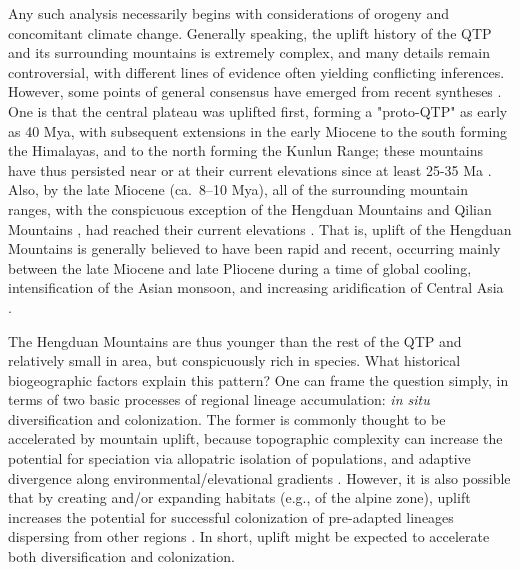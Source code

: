 Any such analysis necessarily begins with considerations of orogeny and concomitant climate change. Generally speaking, the uplift history of the QTP and its surrounding mountains is extremely complex, and many details remain controversial, with different lines of evidence often yielding conflicting inferences. However, some points of general consensus have emerged from recent syntheses \citep{Wang2014, Favre2014, Deng2015}. One is that the central plateau was uplifted first, forming a "proto-QTP" as early as 40 Mya, with subsequent extensions in the early Miocene to the south forming the Himalayas, and to the north forming the Kunlun Range; these mountains have thus persisted near or at their current elevations since at least 25-35 Ma \citep{Rowley2006, Wang2014}. Also, by the late Miocene (ca.\ 8--10 Mya), all of the surrounding mountain ranges, with the conspicuous exception of the Hengduan Mountains and Qilian Mountains , had reached their current elevations \citep{SunB2011,Fang2005,WangE2012,Wang2014,Favre2014,Deng2015}. That is, uplift of the Hengduan Mountains is generally believed to have been rapid and recent, occurring mainly between the late Miocene and late Pliocene \citep{WangE2012,Wang2014,Meng2016,SunB2011} during a time of global cooling, intensification of the Asian monsoon, and increasing aridification of Central Asia \citep{Favre2014}.

The Hengduan Mountains are thus younger than the rest of the QTP and relatively small in area, but conspicuously rich in species. What historical biogeographic factors explain this pattern? One can frame the question simply, in terms of two basic processes of regional lineage accumulation: \textit{in situ} diversification and colonization. The former is commonly thought to be accelerated by mountain uplift, because topographic complexity can increase the potential for speciation via allopatric isolation of populations, and adaptive divergence along environmental/elevational gradients \citep{Hughes2006,LiuJ2006,Xu2010}. However, it is also possible that by creating and/or expanding habitats (e.g., of the alpine zone), uplift increases the potential for successful colonization of pre-adapted lineages dispersing from other regions \citep{Zhou2013}. In short, uplift might be expected to accelerate both diversification and colonization.

